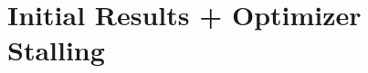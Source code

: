 \documentclass[aspectratio=169]{beamer}
\begin{document}
%  

%
%
%
%
%
%
%
%
%
%
%
%
%

\section{Initial Results + Optimizer Stalling}
\end{document}
